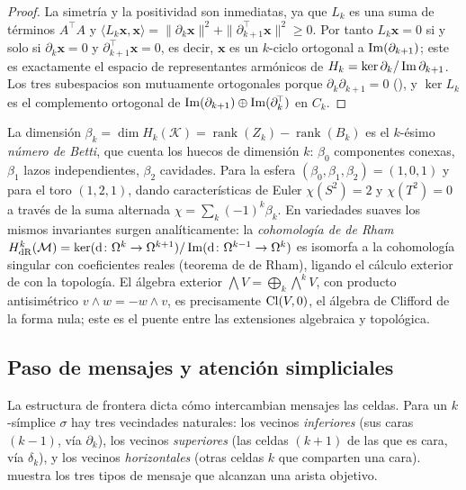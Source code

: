 \begin{proof}
La simetr\'ia y la positividad son inmediatas, ya que $L_k$ es una suma de
t\'erminos $A^{\!\top} A$ y $\langle L_k\mathbf{x}, \mathbf{x}\rangle =
\|\partial_k\mathbf{x}\|^2 + \|\partial_{k+1}^{\!\top}\mathbf{x}\|^2 \ge 0$. Por
tanto $L_k\mathbf{x} = 0$ si y solo si $\partial_k\mathbf{x} = 0$ y
$\partial_{k+1}^{\!\top}\mathbf{x} = 0$, es decir, $\mathbf{x}$ es un $k$-ciclo
ortogonal a $\operatorname{Im}(\partial_{k+1})$; este es exactamente el espacio de
representantes arm\'onicos de $H_k = \ker\partial_k / \operatorname{Im}\partial_{k+1}$. Los
tres subespacios son mutuamente ortogonales porque $\partial_k\partial_{k+1} = 0$
(), y $\ker L_k$ es el complemento ortogonal de
$\operatorname{Im}(\partial_{k+1}) \oplus \operatorname{Im}(\partial_k^{\!\top})$ en $C_k$.
\end{proof}

La dimensi\'on $\beta_k = \dim H_k(\mathcal{K}) = \operatorname{rank}(Z_k) -
\operatorname{rank}(B_k)$ es el $k$-\'esimo \emph{n\'umero de Betti}, que cuenta
los huecos de dimensi\'on $k$: $\beta_0$ componentes conexas, $\beta_1$ lazos
independientes, $\beta_2$ cavidades. Para la esfera $(\beta_0, \beta_1, \beta_2) =
(1, 0, 1)$ y para el toro $(1, 2, 1)$, dando caracter\'isticas de Euler
$\chi(S^2) = 2$ y $\chi(T^2) = 0$ a trav\'es de la suma alternada $\chi = \sum_k
(-1)^k \beta_k$. En variedades suaves los mismos invariantes surgen
anal\'iticamente: la \emph{cohomolog\'ia de de Rham}
$H^k_{\mathrm{dR}}(\mathcal{M}) = \ker(\mathrm{d}\colon \Omega^k \to \Omega^{k+1}) /
\operatorname{Im}(\mathrm{d}\colon \Omega^{k-1} \to \Omega^k)$ es isomorfa a la cohomolog\'ia
singular con coeficientes reales (teorema de de Rham), ligando el c\'alculo
exterior de  con la topolog\'ia. El \'algebra exterior
$\bigwedge V = \bigoplus_k \bigwedge^k V$, con producto antisim\'etrico $v \wedge
w = -w \wedge v$, es precisamente $\operatorname{Cl}(V, 0)$, el \'algebra de Clifford de la
forma nula; este es el puente entre las extensiones algebraica y topol\'ogica.

\subsection{Paso de mensajes y atenci\'on simpliciales}
\label{sec:gauge:simplicial-attention}

La estructura de frontera dicta c\'omo intercambian mensajes las celdas. Para un
$k$-s\'implice $\sigma$ hay tres vecindades naturales: los vecinos
\emph{inferiores} (sus caras $(k-1)$, v\'ia $\partial_k$), los vecinos
\emph{superiores} (las celdas $(k+1)$ de las que es cara, v\'ia $\delta_k$), y los
vecinos \emph{horizontales} (otras celdas $k$ que comparten una cara).
 muestra los tres tipos de mensaje que
alcanzan una arista objetivo.

